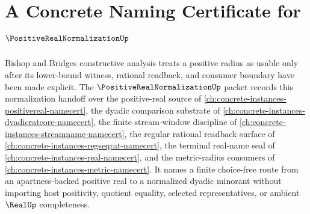 \chapter{A Concrete Naming Certificate for $\PositiveRealNormalizationUp$}
\label{ch:concrete-instances-positive-real-normalization-namecert}

Bishop and Bridges constructive analysis treats a positive radius as usable only after its lower-bound witness, rational readback, and consumer boundary have been made explicit. The $\PositiveRealNormalizationUp$ packet records this normalization handoff over the positive-real source of \autoref{ch:concrete-instances-positivereal-namecert}, the dyadic comparison substrate of \autoref{ch:concrete-instances-dyadicratcore-namecert}, the finite stream-window discipline of \autoref{ch:concrete-instances-streamname-namecert}, the regular rational readback surface of \autoref{ch:concrete-instances-regseqrat-namecert}, the terminal real-name seal of \autoref{ch:concrete-instances-real-namecert}, and the metric-radius consumers of \autoref{ch:concrete-instances-metric-namecert}. It names a finite choice-free route from an apartness-backed positive real to a normalized dyadic minorant without importing host positivity, quotient equality, selected representatives, or ambient $\RealUp$ completeness.

